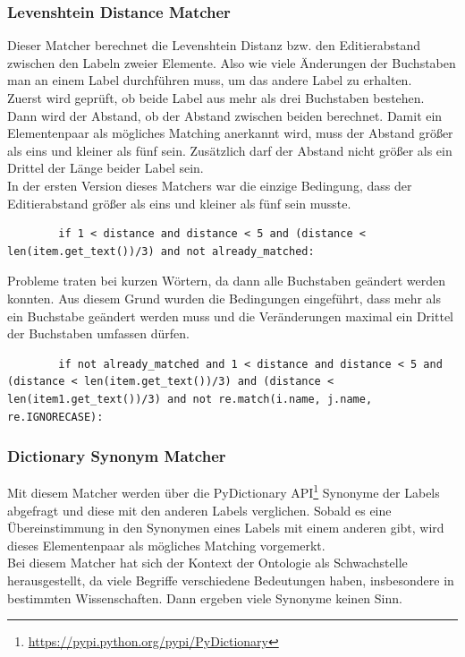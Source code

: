 		\subsubsection{Levenshtein Distance Matcher}
		Dieser Matcher berechnet die Levenshtein Distanz bzw. den Editierabstand
		zwischen den Labeln zweier Elemente. Also wie viele Änderungen der Buchstaben
		man an einem Label durchführen muss, um das andere Label zu erhalten.\\
		Zuerst wird geprüft, ob beide Label aus mehr als drei Buchstaben bestehen.
		Dann wird der Abstand, ob der Abstand zwischen beiden berechnet. Damit ein
		Elementenpaar als mögliches Matching anerkannt wird, muss der Abstand größer
		als eins und kleiner als fünf sein. Zusätzlich darf der Abstand nicht größer
		als ein Drittel der Länge beider Label sein.\\
		In der ersten Version dieses Matchers war die einzige Bedingung, dass der
		Editierabstand größer als eins und kleiner als fünf sein musste.
		\begin{lstlisting}
		if 1 < distance and distance < 5 and (distance < len(item.get_text())/3) and not already_matched:
		\end{lstlisting}
		Probleme traten bei kurzen Wörtern, da dann alle Buchstaben geändert werden
		konnten. Aus diesem Grund wurden die Bedingungen eingeführt, dass mehr als ein Buchstabe
		geändert werden muss und die Veränderungen maximal ein Drittel der Buchstaben
		umfassen dürfen.
		\begin{lstlisting}
		if not already_matched and 1 < distance and distance < 5 and (distance < len(item.get_text())/3) and (distance < len(item1.get_text())/3) and not re.match(i.name, j.name, re.IGNORECASE):
		\end{lstlisting}
				
		\subsubsection{Dictionary Synonym Matcher}
		Mit diesem Matcher werden über die PyDictionary
		API\footnote{\url{https://pypi.python.org/pypi/PyDictionary}} Synonyme der
		Labels abgefragt und diese mit den anderen Labels verglichen. Sobald es eine Übereinstimmung in den Synonymen eines Labels mit einem anderen gibt, wird
		dieses Elementenpaar als mögliches Matching vorgemerkt.\\
		Bei diesem Matcher hat sich der Kontext der Ontologie als Schwachstelle
		herausgestellt, da viele Begriffe verschiedene Bedeutungen haben, insbesondere
		in bestimmten Wissenschaften. Dann ergeben viele Synonyme keinen Sinn.
		
